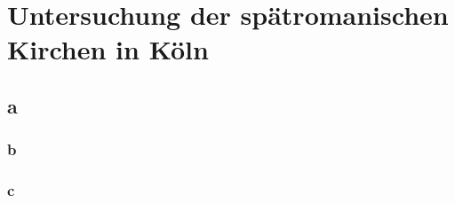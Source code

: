\chapter{Untersuchung der spätromanischen Kirchen in Köln}

\section{a}
\subsection{b}
\subsection{c}

\blindtext[5]